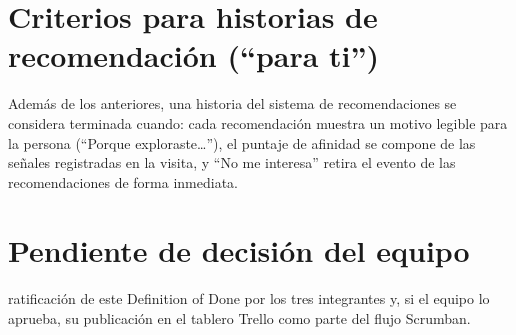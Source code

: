 \documentclass[11pt,a4paper]{article}
\begin{document}
\section{Criterios para historias de recomendación (``para ti'')}

Además de los anteriores, una historia del sistema de recomendaciones se
considera terminada cuando: cada recomendación muestra un motivo legible para
la persona (``Porque exploraste\ldots''), el puntaje de afinidad se compone de
las señales registradas en la visita, y ``No me interesa'' retira el evento de
las recomendaciones de forma inmediata.

\section{Pendiente de decisión del equipo}

\begin{pendienteenv}
ratificación de este Definition of Done por los tres integrantes y, si el
equipo lo aprueba, su publicación en el tablero Trello como parte del flujo
Scrumban.
\end{pendienteenv}
\end{document}
